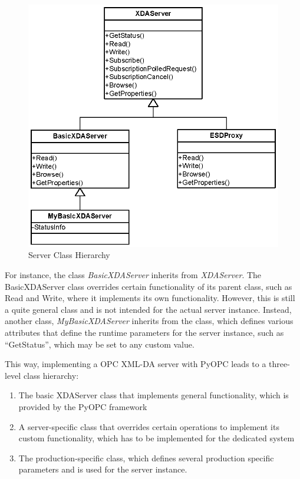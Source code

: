 \begin{figure}[ht]
\centering
\includegraphics[scale=0.7]{graphics/server_hierarchy.eps}
\caption{Server Class Hierarchy}
\label {server_hierarchy} 
\end{figure}

For instance, the class {\sl BasicXDAServer} inherits from {\sl
XDAServer}.  The BasicXDAServer class overrides certain functionality
of its parent class, such as Read and Write, where it implements its
own functionality. However, this is still a quite general class and
is not intended for the actual server instance. Instead, another class,
{\sl MyBasicXDAServer} inherits from the class, which defines various
attributes that define the runtime parameters for the server instance,
such as ``GetStatus'', which may be set to any custom value.

This way, implementing a OPC XML-DA server with PyOPC leads to a three-level
class hierarchy:

\begin{enumerate}
\item The basic XDAServer class that implements general functionality, which
is provided by the PyOPC framework
\item A server-specific class that overrides certain operations to
implement its custom functionality, which has to be implemented for
the dedicated system
\item The production-specific class, which defines several production 
specific parameters and is used for the server instance.
\end{enumerate}

